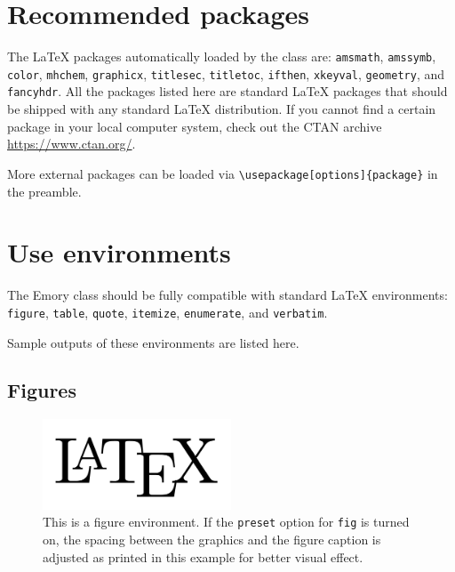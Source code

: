 \documentclass[final]{emory}
\begin{document}
\section{Recommended packages}
The \LaTeX{} packages automatically loaded by the class are: \Verb|amsmath|, 
\Verb|amssymb|, \Verb|color|, \Verb|mhchem|, \Verb|graphicx|, \Verb|titlesec|, 
\Verb|titletoc|, \Verb|ifthen|, \Verb|xkeyval|, \Verb|geometry|, and 
\Verb|fancyhdr|. All the packages listed here are standard \LaTeX{} packages 
that should be shipped with any standard \LaTeX{} distribution. If you cannot 
find a certain package in your local computer system, check out the CTAN 
archive \url{https://www.ctan.org/}.

More external packages can be loaded via \Verb|\usepackage[options]{package}|
in the preamble. 


\section{Use environments}\label{sec:env}
The Emory class should be fully compatible with standard \LaTeX{} environments:
\Verb|figure|, \Verb|table|, \Verb|quote|, \Verb|itemize|, \Verb|enumerate|,
and \Verb|verbatim|.

Sample outputs of these environments are listed here. 

\subsection{Figures}

\begin{figure}[htp!]
  \centering
  \includegraphics[width=0.5\textwidth]{LaTeXLogo.png}
  \caption[This is a figure environment]{This is a figure 
  environment.\label{fig} If the \protect\Verb|preset| option 
  for \protect\Verb|fig| is turned on, the spacing between the graphics and the 
  figure caption is adjusted as printed in this example for better visual 
  effect.}
\end{figure}
\end{document}
